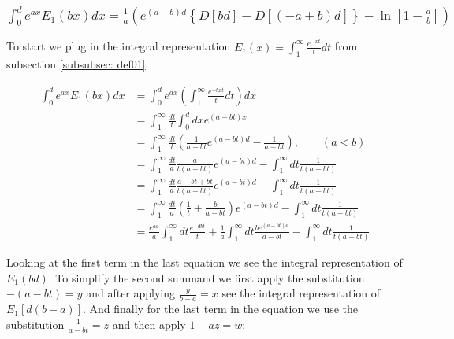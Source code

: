 \documentclass[bibliography=totocnumbered]{scrartcl}
\newcommand{\assume}[1][\text{MISSING PARAMETER}]{,\qquad\left(#1\right)}
\begin{document}
	\subsubsection[A integral of E1(x), involving the exponential function]{$\int_{0}^{d}e^{ax}E_1\left(bx\right)dx=\frac{1}{a}\left(e^{\left(a-b\right)d}\left\{D\left[bd\right]-D\left[\left(-a+b\right)d\right]\right\}-\ln{\left[1-\frac{a}{b}\right]}\right)$}
	\label{subsubsec: generalIntegralOfE4}

	To start we plug in the integral representation $E_1\left(x\right)=\int_{1}^{\infty}\frac{e^{-xt}}{t}dt$ from subsection \ref{subsubsec: def01}:

	\begin{align}
		\int_{0}^{d}e^{ax}E_1\left(bx\right)dx&=\int_{0}^{d}e^{ax}\left(\int_{1}^{\infty}\frac{e^{-bxt}}{t}dt\right)dx\\
		&=\int_{1}^{\infty}\frac{dt}{t}\int_{0}^{d}dxe^{\left(a-bt\right)x}\\
		&=\int_{1}^{\infty}\frac{dt}{t}\left(\frac{1}{a-bt}e^{\left(a-bt\right)d}-\frac{1}{a-bt}\right)\assume[a<b]\\
		&=\int_{1}^{\infty}\frac{dt}{a}\frac{a}{t\left(a-bt\right)}e^{\left(a-bt\right)d}-\int_{1}^{\infty}dt\frac{1}{t\left(a-bt\right)}\\
		&=\int_{1}^{\infty}\frac{dt}{a}\frac{a-bt+bt}{t\left(a-bt\right)}e^{\left(a-bt\right)d}-\int_{1}^{\infty}dt\frac{1}{t\left(a-bt\right)}\\
		&=\int_{1}^{\infty}\frac{dt}{a}\left(\frac{1}{t}+\frac{b}{a-bt}\right)e^{\left(a-bt\right)d}-\int_{1}^{\infty}dt\frac{1}{t\left(a-bt\right)}\\
		&=\frac{e^{ad}}{a}\int_{1}^{\infty}dt\frac{e^{-dbt}}{t}+\frac{1}{a}\int_{1}^{\infty}dt\frac{be^{\left(a-bt\right)d}}{a-bt}-\int_{1}^{\infty}dt\frac{1}{t\left(a-bt\right)}
	\end{align}

	Looking at the first term in the last equation we see the integral representation of $E_1\left(bd\right)$. To simplify the second summand we first apply the substitution $-\left(a-bt\right)=y$ and after applying $\frac{y}{b-a}=x$ see the integral representation of $E_1\left[d\left(b-a\right)\right]$. And finally for the last term in the equation we use the substitution $\frac{1}{a-bt}=z$ and then apply $1-az=w$:
\end{document}

